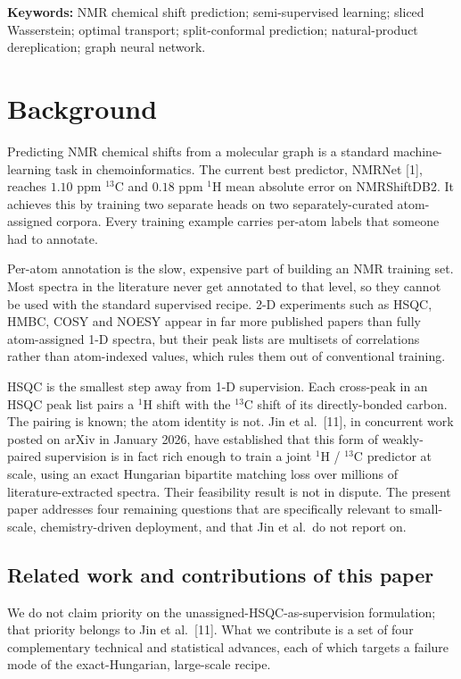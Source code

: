 \documentclass[
  11pt,
  a4paper,
]{article}
\begin{document}
\textbf{Keywords:} NMR chemical shift prediction; semi-supervised learning;
sliced Wasserstein; optimal transport; split-conformal prediction;
natural-product dereplication; graph neural network.

\clearpage

\section{Background}\label{background}

Predicting NMR chemical shifts from a molecular graph is a standard
machine-learning task in chemoinformatics. The current best predictor,
NMRNet {[}1{]}, reaches \(1.10\) ppm \(^{13}\)C and \(0.18\) ppm \(^{1}\)H mean
absolute error on NMRShiftDB2. It achieves this by training two separate
heads on two separately-curated atom-assigned corpora. Every training
example carries per-atom labels that someone had to annotate.

Per-atom annotation is the slow, expensive part of building an NMR
training set. Most spectra in the literature never get annotated to that
level, so they cannot be used with the standard supervised recipe. 2-D
experiments such as HSQC, HMBC, COSY and NOESY appear in far more
published papers than fully atom-assigned 1-D spectra, but their peak
lists are multisets of correlations rather than atom-indexed values,
which rules them out of conventional training.

HSQC is the smallest step away from 1-D supervision. Each cross-peak
in an HSQC peak list pairs a \(^{1}\)H shift with the \(^{13}\)C shift of
its directly-bonded carbon. The pairing is known; the atom identity
is not. Jin et al.~{[}11{]}, in concurrent work posted on arXiv in
January 2026, have established that this form of weakly-paired
supervision is in fact rich enough to train a joint \(^{1}\)H / \(^{13}\)C
predictor at scale, using an exact Hungarian bipartite matching loss
over millions of literature-extracted spectra. Their feasibility
result is not in dispute. The present paper addresses four remaining
questions that are specifically relevant to small-scale,
chemistry-driven deployment, and that Jin et al.~do not report on.

\subsection*{Related work and contributions of this paper}

We do not claim priority on the unassigned-HSQC-as-supervision
formulation; that priority belongs to Jin et al.~{[}11{]}. What we
contribute is a set of four complementary technical and statistical
advances, each of which targets a failure mode of the
exact-Hungarian, large-scale recipe.
\end{document}
